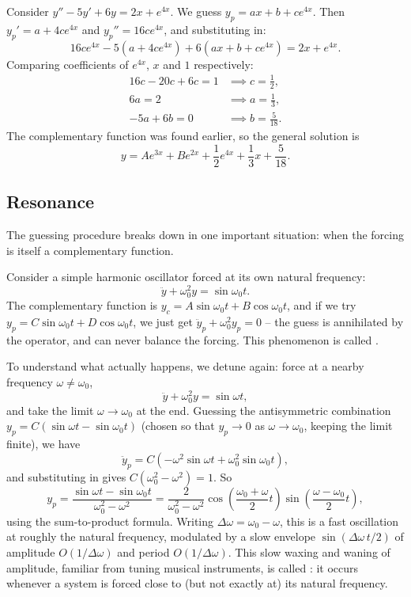 \documentclass[a4paper]{scrartcl}
\begin{document}
\begin{example}
	Consider $y'' - 5y' + 6y = 2x + e^{4x}$. We guess $y_p = ax + b + ce^{4x}$. Then $y_p' = a + 4ce^{4x}$ and $y_p'' = 16 c e^{4x}$, and substituting in:
	$$
	16 c e^{4x} - 5(a + 4ce^{4x}) + 6(ax + b + ce^{4x}) = 2x + e^{4x}.
	$$
	Comparing coefficients of $e^{4x}$, $x$ and $1$ respectively:
	\begin{align*}
		16c - 20c + 6c = 1 &\implies c = \tfrac{1}{2}, \\
		6a = 2 &\implies a = \tfrac{1}{3}, \\
		-5a + 6b = 0 &\implies b = \tfrac{5}{18}.
	\end{align*}
	The complementary function was found earlier, so the general solution is
	$$
	y = A e^{3x} + B e^{2x} + \frac{1}{2}e^{4x} + \frac{1}{3}x + \frac{5}{18}.
	$$
\end{example}

\subsection{Resonance}

The guessing procedure breaks down in one important situation: when the forcing is itself a complementary function.

Consider a simple harmonic oscillator forced at its own natural frequency:
$$
\ddot{y} + \omega_0^2 y = \sin \omega_0 t.
$$
The complementary function is $y_c = A \sin \omega_0 t + B \cos \omega_0 t$, and if we try $y_p = C \sin \omega_0 t + D \cos \omega_0 t$, we just get $\ddot y_p + \omega_0^2 y_p = 0$ -- the guess is annihilated by the operator, and can never balance the forcing. This phenomenon is called .

To understand what actually happens, we detune again: force at a nearby frequency $\omega \neq \omega_0$,
$$
\ddot y + \omega_0^2 y = \sin \omega t,
$$
and take the limit $\omega \to \omega_0$ at the end. Guessing the antisymmetric combination $y_p = C(\sin \omega t - \sin \omega_0 t)$ (chosen so that $y_p \to 0$ as $\omega \to \omega_0$, keeping the limit finite), we have
$$
\ddot y_p = C(-\omega^2 \sin \omega t + \omega_0^2 \sin \omega_0 t),
$$
and substituting in gives $C(\omega_0^2 - \omega^2) = 1$. So
$$
y_p = \frac{\sin \omega t - \sin \omega_0 t}{\omega_0^2 - \omega^2} = \frac{2}{\omega_0^2 - \omega^2} \cos\left(\frac{\omega_0 + \omega}{2} t\right) \sin \left(\frac{\omega - \omega_0}{2}t\right),
$$
using the sum-to-product formula. Writing $\Delta \omega = \omega_0 - \omega$, this is a fast oscillation at roughly the natural frequency, modulated by a slow envelope $\sin(\Delta\omega \, t/2)$ of amplitude $O(1/\Delta \omega)$ and period $O(1/\Delta\omega)$. This slow waxing and waning of amplitude, familiar from tuning musical instruments, is called : it occurs whenever a system is forced close to (but not exactly at) its natural frequency.
\end{document}
